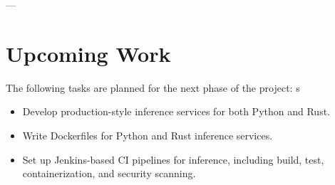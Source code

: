 \documentclass[11pt,a4paper]{article}
\begin{document}
---

\section{Upcoming Work}

The following tasks are planned for the next phase of the project:
s
\begin{itemize}
    \item Develop production-style inference services for both Python and Rust.
    \item Write Dockerfiles for Python and Rust inference services.
    \item Set up Jenkins-based CI pipelines for inference, including build, test, containerization, and security scanning.
\end{itemize}
\end{document}
